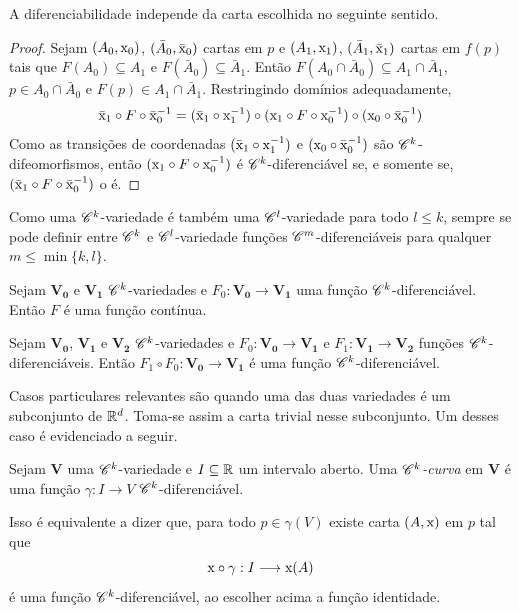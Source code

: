 A diferenciabilidade independe da carta escolhida no seguinte sentido.

\begin{proof}
Sejam $(A_0,\mathrm{x}_0)$, $(\bar A_0,\bar{\mathrm{x}}_0)$ cartas em $p$ e $(A_1,\mathrm{x}_1)$, $(\bar A_1,\bar{\mathrm{x}}_1)$ cartas em $f(p)$ tais que $F(A_0) \subseteq A_1$ e $F(\bar A_0) \subseteq \bar A_1$. Então $F(A_0 \cap \bar A_0) \subseteq A_1 \cap \bar A_1$, $p \in A_0 \cap \bar A_0$ e $F(p) \in A_1 \cap \bar A_1$. Restringindo domínios adequadamente,
	\begin{equation*}
	\bar {\mathrm{x}}_1 \circ F \circ \bar {\mathrm{x}}_0^{-1} = (\bar {\mathrm{x}}_1 \circ \mathrm{x}_1^{-1}) \circ (\mathrm{x}_1 \circ F \circ \mathrm{x}_0 ^{-1}) \circ (\mathrm{x}_0 \circ \bar {\mathrm{x}}_0^{-1})
	\end{equation*}
Como as transições de coordenadas $(\bar {\mathrm{x}}_1 \circ \mathrm{x}_1^{-1})$ e $(\mathrm{x}_0 \circ \bar {\mathrm{x}}_0^{-1})$ são $\mathscr{C}^k$-difeomorfismos, então $(\mathrm{x}_1 \circ F \circ \mathrm{x}_0 ^{-1})$ é $\mathscr{C}^k$-diferenciável se, e somente se, $(\bar {\mathrm{x}}_1 \circ F \circ \bar {\mathrm{x}}_0^{-1})$ o é.
\end{proof}

Como uma $\mathscr{C}^k$-variedade é também uma $\mathscr{C}^l$-variedade para todo $l\leq k$, sempre se pode definir entre $\mathscr{C}^k$ e $\mathscr{C}^l$-variedade funções $\mathscr{C}^m$-diferenciáveis para qualquer $m \leq \min\{k,l\}$.

\begin{prop}
Sejam $\bm{V_0}$ e $\bm{V_1}$ $\mathscr{C}^k$-variedades e $F_0: \bm{V_0} \to \bm{V_1}$ uma função $\mathscr{C}^k$-diferenciável. Então $F$ é uma função contínua.
\end{prop}

\begin{prop}
Sejam $\bm{V_0}$, $\bm{V_1}$ e $\bm{V_2}$ $\mathscr{C}^k$-variedades e $F_0: \bm{V_0} \to \bm{V_1}$ e $F_1: \bm{V_1} \to \bm{V_2}$ funções $\mathscr{C}^k$-diferenciáveis. Então $F_1 \circ F_0: \bm{V_0} \to \bm{V_1}$ é uma função $\mathscr{C}^k$-diferenciável.
\end{prop}

Casos particulares relevantes são quando uma das duas variedades é um subconjunto de $\mathbb{R}^d$. Toma-se assim a carta trivial nesse subconjunto. Um desses caso é evidenciado a seguir.

\begin{defi}
Sejam $\bm V$ uma $\mathscr{C}^k$-variedade e $I \subseteq \mathbb{R}$ um intervalo aberto. Uma \emph{$\mathscr{C}^k$-curva} em $\bm V$ é uma função $\gamma: I \to V$ $\mathscr{C}^k$-diferenciável.
\end{defi}

Isso é equivalente a dizer que, para todo $p \in \gamma(V)$ existe carta $(A,\mathrm{x})$ em $p$ tal que
	\begin{equation*}
	\mathrm{x} \circ \gamma: I \longrightarrow \mathrm{x}(A)
	\end{equation*}
é uma função $\mathscr{C}^k$-diferenciável, ao escolher acima a função identidade.

